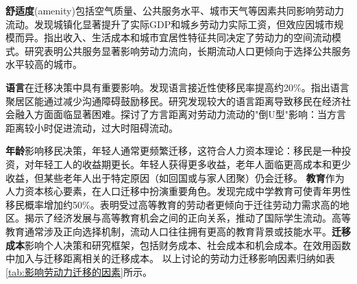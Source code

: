 \documentclass[a4paper, zihao=-4, fontset = mac, oneside]{ctexbook} %
\begin{document}
\textbf{舒适度}(amenity)包括空气质量、公共服务水平、城市天气等因素共同影响劳动力流动。\textcite{YangXiChengShiGuiMoYuChengZhenHuaNongMinGongShiMinHuaDeJingJiXiaoYingJiYuChengShiShengChanLuYuYiJuDuChaiYiDeDingLiangFenXi2017}发现城镇化显著提升了实际GDP和城乡劳动力实际工资，但效应因城市规模而异。\textcite{WangLiNuoJiYuYaLiMenJianJiaShuoDeJiaTingQianJuYiXiangXingChengJiZhiYanJiuYiHangZhouShiQuWeiLi2007}指出收入、生活成本和城市宜居性特征共同决定了劳动力的空间流动模式。\textcite{XiaYiRanChengShiJianDeMengMuSanQianGongGongFuWuYingXiangLaoDongLiLiuXiangDeJingYanYanJiu2015}研究表明公共服务显著影响劳动力流向，长期流动人口更倾向于选择公共服务水平较高的城市。

\textbf{语言}在迁移决策中具有重要影响。\textcite{adseraRoleLanguageShaping2015}发现语言接近性使移民率提高约20\%。\textcite{bauerEnclavesLanguageLocation2005}指出语言聚居区能通过减少沟通障碍鼓励移民。\textcite{isphordingLinguisticBarriersDestination2014}研究发现较大的语言距离导致移民在经济社会融入方面面临显著困难。\textcite{LiuYuYunLaoDongLiKuaFangYanLiuDongDeDaoUXingMoShi2015}探讨了方言距离对劳动力流动的"倒U型"影响：当方言距离较小时促进流动，过大时阻碍流动。

\textbf{年龄}影响移民决策，年轻人通常更频繁迁移，这符合人力资本理论：移民是一种投资，对年轻工人的收益期更长。年轻人获得更多收益，老年人面临更高成本和更少收益，但某些老年人出于特定原因（如回国或与家人团聚）仍会迁移。
\textbf{教育}作为人力资本核心要素，在人口迁移中扮演重要角色。\textcite{aydemirEffectEducationInternal2022}发现完成中学教育可使青年男性移民概率增加约50\%。\textcite{wozniakAreCollegeGraduates2010}表明受过高等教育的劳动者更倾向于迁往劳动力需求高的地区。\textcite{weberStudentMigrationTransition2023}揭示了经济发展与高等教育机会之间的正向关系，推动了国际学生流动。高等教育通常涉及正向选择机制，流动人口往往拥有更高的教育背景或技能水平。\textbf{迁移成本}影响个人决策和研究框架，包括财务成本、社会成本和机会成本。\textcite{LiuChenHuiLaoDongLiLiuDongJiNengPiPeiYuDiQuJingJiChaiJu2022}在效用函数中加入与迁移距离相关的迁移成本。
以上讨论的劳动力迁移影响因素归纳如表\ref{tab:影响劳动力迁移的因素}所示。
\end{document}
